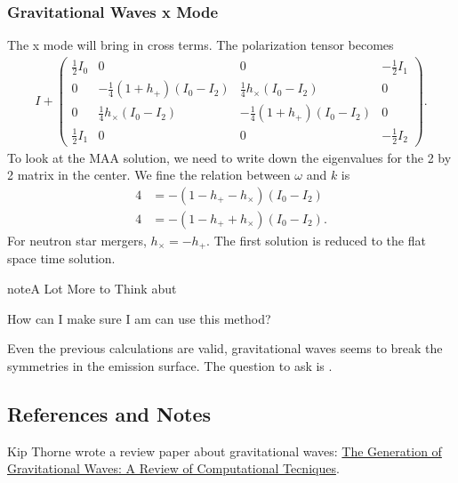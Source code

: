 \documentclass[letterpaper,12pt,english]{sphinxmanual}
\begin{document}
\subsubsection{Gravitational Waves x Mode}
\label{\detokenize{gravity/gravitational-waves:gravitational-waves-x-mode}}
The x mode will bring in cross terms. The polarization tensor becomes
\begin{equation*}
\begin{split}I + \begin{pmatrix}
\frac{1}{2} I_0 & 0 & 0 & -\frac{1}{2}I_1\\
0 & -\frac{1}{4}(1+h_+) (I_0-I_2) & \frac{1}{4} h_\times (I_0-I_2)  & 0 \\
0 & \frac{1}{4}h_\times (I_0 - I_2) & -\frac{1}{4}(1+h_+) (I_0-I_2) & 0  \\
\frac{1}{2}I_1 & 0 & 0 & -\frac{1}{2}I_2
\end{pmatrix}.\end{split}
\end{equation*}
To look at the MAA solution, we need to write down the eigenvalues for the 2 by 2 matrix in the center. We fine the relation between \(\omega\) and \(k\) is
\begin{equation*}
\begin{split}4 &= -(1-h_+ - h_\times) (I_0-I_2)\\
4 &= -(1-h_+ + h_\times) (I_0-I_2).\end{split}
\end{equation*}
For neutron star mergers, \(h_\times=-h_+\). The first solution is reduced to the flat space time solution.

\begin{sphinxadmonition}{note}{A Lot More to Think abut}

How can I make sure I am can use this method?

Even the previous calculations are valid, gravitational waves seems to break the symmetries in the emission surface. The question to ask is .
\end{sphinxadmonition}


\subsection{References and Notes}
\label{\detokenize{gravity/gravitational-waves:references-and-notes}}
Kip Thorne wrote a review paper about gravitational waves: \href{https://www.its.caltech.edu/~kip/scripts/PubScans/II-68.pdf}{The Generation of Gravitational Waves: A Review of Computational Tecniques}.
\end{document}

